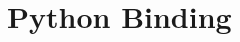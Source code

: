 \documentclass{beamer}
\begin{document}
\frame[plain]{\titlepage}
\section{Python Binding}

\end{document}
